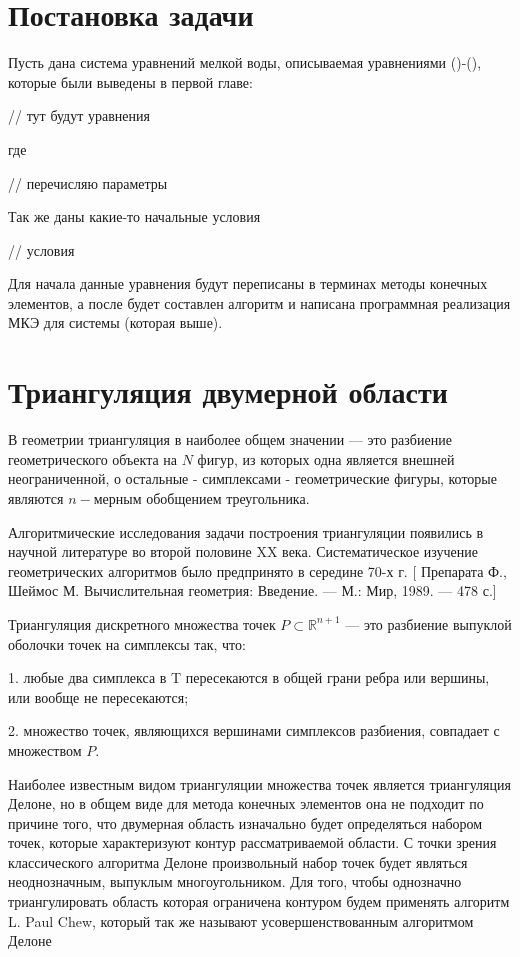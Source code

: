 \documentclass[14pt]{extreport}
\begin{document}
\chapter{Постановка задачи}

Пусть дана система уравнений мелкой воды, описываемая уравнениями ()-(), которые были выведены в первой главе:

// тут будут уравнения

где

// перечисляю параметры


Так же даны какие-то начальные условия

// условия


Для начала данные уравнения будут переписаны в терминах методы конечных элементов, а после будет составлен алгоритм и написана программная реализация МКЭ для системы (которая выше).


\chapter{Триангуляция двумерной области}

В геометрии триангуляция в наиболее общем значении — это разбиение геометрического объекта на $N$ фигур, из которых одна является внешней неограниченной, о остальные - симплексами -  геометрические фигуры, которые являются $n-$мерным обобщением треугольника. 


Алгоритмические исследования задачи построения триангуляции появились в научной
литературе во второй половине XX века. Систематическое изучение геометрических
алгоритмов было предпринято в середине 70-х г. [ Препарата Ф., Шеймос М. Вычислительная геометрия: Введение. –– М.: Мир, 1989. ––
478 с.]


Триангуляция дискретного множества точек $P\subset {\mathbb  {R}}^{{n+1}}$ — это разбиение выпуклой оболочки точек на симплексы так, что:

	1. любые два симплекса в T пересекаются в общей грани ребра или вершины, или вообще не пересекаются;

	2. множество точек, являющихся вершинами симплексов разбиения, совпадает с множеством ${\displaystyle P}$. 

Наиболее известным видом триангуляции множества точек является триангуляция Делоне, но в общем виде для метода конечных элементов она не подходит по причине того, что двумерная область изначально будет определяться набором точек, которые характеризуют контур рассматриваемой области. С точки зрения классического алгоритма Делоне произвольный набор точек будет являться неоднозначным, выпуклым многоугольником. Для того, чтобы однозначно триангулировать область которая ограничена контуром будем применять алгоритм L. Paul Chew, который так же называют усовершенствованным алгоритмом Делоне
\end{document}

